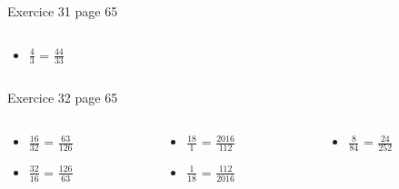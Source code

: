 \documentclass[xcolor={dvipsnames}, handout]{beamer}
\begin{document}
\begin{frame}
\begin{block}{Exercice 31 page 65}
\begin{columns}
		\begin{column}{0.25\textwidth}
			\begin{huge}
				\begin{itemize}
					
					\item $\frac{4}{3}$ = \pause $\frac{44}{33}$\pause					
				\end{itemize}	
			\end{huge}
			
		\end{column}
	\end{columns}		
	
	\end{block}	


	\begin{block}{Exercice 32 page 65}
		\begin{columns}
			\begin{column}{0.25\textwidth}
				\begin{LARGE}
					\begin{itemize}
						\setlength\itemsep{1em}
						\item $\frac{16}{32}$ =  $\frac{63}{126}$ \pause
						
						\item $\frac{32}{16}$ =  $\frac{126}{63}$ \pause
						
						
					\end{itemize}	
				\end{LARGE}
				
			\end{column}
			
			\begin{column}{0.25\textwidth}
				\begin{LARGE}
					\begin{itemize}
						\setlength\itemsep{1em}
						\item $\frac{18}{1}$ = $\frac{2016}{112}$ 
						
						\item $\frac{1}{18}$ = $\frac{112}{2016}$ \pause
						
						
						
					\end{itemize}	
				\end{LARGE}
				
			\end{column}
			
			\begin{column}{0.25\textwidth}
				\begin{LARGE}
					\begin{itemize}
						\setlength\itemsep{1em}
						\item $\frac{8}{84}$ = $\frac{24}{252}$
						

\end{itemize}
\end{LARGE}
\end{column}
\end{columns}
\end{block}
\end{frame}
\end{document}
